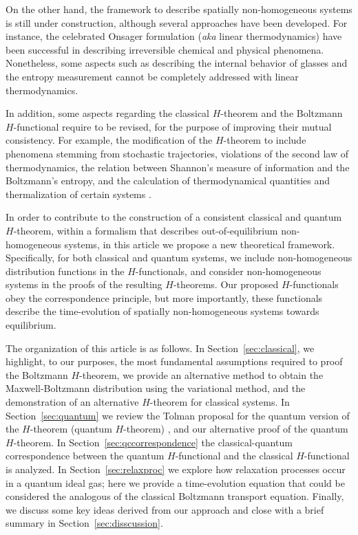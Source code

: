 On the other hand, the framework to describe spatially non-homogeneous systems is still
under construction, although several approaches have been developed. For instance,
the celebrated Onsager formulation (\textit{aka} linear thermodynamics)
\cite{bib:keizer1987,bib:onsager1931} have been successful in describing irreversible chemical 
and physical phenomena. Nonetheless, some aspects such as describing the internal behavior of glasses
\cite{bib:zanotto2018} and the entropy measurement
\cite{bib:schmelzer2018,bib:nemilov2018} cannot be completely addressed with linear thermodynamics.

In addition, some aspects regarding the classical $H$-theorem and the
Boltzmann $H$-functional require to be revised, for the purpose of improving their mutual consistency.
For example, the modification of the $H$-theorem to include phenomena stemming from stochastic
trajectories, violations of the second law of thermodynamics, the relation
between Shannon's measure of information and the Boltzmann's entropy, 
and the calculation of thermodynamical quantities and thermalization of certain systems
\cite{bib:gorban2014,bib:li2019,bib:gring2012,bib:nemilov2018,bib:wang2014}.

In order to contribute to the construction of a consistent classical and
quantum $H$-theorem, within a formalism that describes out-of-equilibrium
non-homogeneous systems, in this article we propose a new theoretical framework.
Specifically, for both classical and quantum systems, we include non-homogeneous distribution functions in
the $H$-functionals, and consider non-homogeneous systems in the proofs of the resulting
$H$-theorems. Our proposed $H$-functionals obey
the correspondence principle, but more importantly, these functionals describe
the time-evolution of spatially non-homogeneous
systems towards equilibrium.

The organization of this article is as follows.
In Section~\ref{sec:classical}, we highlight, to our purposes, the most
fundamental assumptions required to proof the Boltzmann $H$-theorem,
we provide an alternative method to obtain the Maxwell-Boltzmann
distribution using the variational method, and the demonstration of
an alternative $H$-theorem for classical systems. In Section~\ref{sec:quantum}
we review the Tolman proposal for the quantum
version of the $H$-theorem (quantum $H$-theorem)
,
and our alternative proof of the quantum $H$-theorem. In 
Section~\ref{sec:qccorrespondence}
the classical-quantum correspondence between the
quantum $H$-functional and the classical $H$-functional is analyzed.
In Section~\ref{sec:relaxproc} we explore how relaxation processes occur
in a quantum ideal gas; here we provide a time-evolution equation that could be
considered the analogous of the classical Boltzmann transport equation. Finally,
we discuss some key ideas derived from our approach and close with a brief summary
in Section~\ref{sec:disscussion}.


